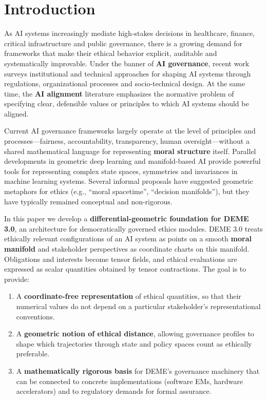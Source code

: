 \documentclass[12pt]{article}
\theoremstyle{remark}
\begin{document}
\section{Introduction}

As AI systems increasingly mediate high-stakes decisions in healthcare, finance, critical infrastructure and public governance, there is a growing demand for frameworks that make their ethical behavior explicit, auditable and systematically improvable. Under the banner of \textbf{AI governance}, recent work surveys institutional and technical approaches for shaping AI systems through regulations, organizational processes and socio-technical design. At the same time, the \textbf{AI alignment} literature emphasizes the normative problem of specifying clear, defensible values or principles to which AI systems should be aligned.

Current AI governance frameworks largely operate at the level of principles and processes---fairness, accountability, transparency, human oversight---without a shared mathematical language for representing \textbf{moral structure} itself. Parallel developments in geometric deep learning and manifold-based AI provide powerful tools for representing complex state spaces, symmetries and invariances in machine learning systems. Several informal proposals have suggested geometric metaphors for ethics (e.g., ``moral spacetime'', ``decision manifolds''), but they have typically remained conceptual and non-rigorous.

In this paper we develop a \textbf{differential-geometric foundation for DEME 3.0}, an architecture for democratically governed ethics modules. DEME 3.0 treats ethically relevant configurations of an AI system as points on a smooth \textbf{moral manifold} and stakeholder perspectives as coordinate charts on this manifold. Obligations and interests become tensor fields, and ethical evaluations are expressed as scalar quantities obtained by tensor contractions. The goal is to provide:

\begin{enumerate}
    \item A \textbf{coordinate-free representation} of ethical quantities, so that their numerical values do not depend on a particular stakeholder's representational conventions.
    \item A \textbf{geometric notion of ethical distance}, allowing governance profiles to shape which trajectories through state and policy spaces count as ethically preferable.
    \item A \textbf{mathematically rigorous basis} for DEME's governance machinery that can be connected to concrete implementations (software EMs, hardware accelerators) and to regulatory demands for formal assurance.
\end{enumerate}
\end{document}
